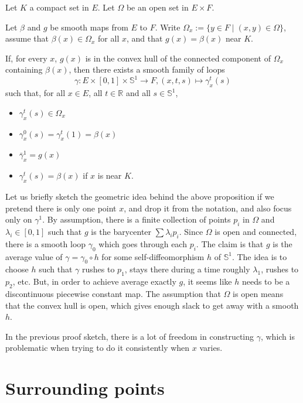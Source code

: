 \documentclass[10pt,a4paper]{article}
\newcommand{\co}{\!:}
\newcommand{\uses}[1]{}
\newcommand{\lean}[1]{}
\newcommand{\leanok}{}
\begin{document}
\begin{proposition}
  \label{prop:∃_loops}
  \lean{exist_loops}
  \uses{def:loop}
  \leanok
  Let $K$ a compact set in $E$. Let $Ω$ be an open set in $E × F$.

  Let $β$ and $g$ be smooth maps from $E$ to $F$.
  Write $Ω_x := \{ y ∈ F \mid (x, y) ∈ Ω\}$, assume that $β(x) ∈ Ω_x$ for all $x$,
  and that $g(x) = β(x)$ near $K$.

  If, for every $x$, $g(x)$ is in
  the convex hull of the connected component of $Ω_x$ containing $β(x)$,
  then there exists a smooth family of loops
  \[
    γ \co E × [0, 1] × 𝕊^1 → F, (x, t, s) ↦ γ^t_x(s)
  \]
  such that, for all $x ∈ E$, all $t ∈ ℝ$ and all  $s ∈ 𝕊^1$,
  \begin{itemize}
    \item
      $γ^t_x(s) ∈ Ω_x$
    \item
      $γ^0_x(s) = γ^t_x(1) = β(x)$
    \item
      $\bar γ^1_x = g(x)$
    \item
      $γ^t_x(s) = β(x)$ if $x$ is near $K$.
  \end{itemize}
\end{proposition}

Let us briefly sketch the geometric idea behind the above proposition
if we pretend there is only one point $x$, and drop it from the
notation, and also focus only on $γ^1$.
By assumption, there is a finite collection of points $p_i$ in $Ω$ and $λ_i ∈
[0, 1]$ such that $g$ is the barycenter $\sum λ_i p_i$. Since $Ω$ is open and
connected, there is a smooth loop $γ_0$ which goes through each $p_i$. The
claim is that $g$ is the average value of $γ = γ_0 ∘ h$ for some
self-diffeomorphism $h$ of $𝕊^1$. The idea is to choose $h$ such that
$γ$ rushes to $p_1$, stays there during a time roughly $λ_1$, rushes to
$p_2$, etc. But, in order to achieve average exactly $g$, it seems like $h$
needs to be a discontinuous piecewise constant map. The assumption that $Ω$ is
open means that the convex hull is open, which gives enough slack to get away with
a smooth $h$.

In the previous proof sketch, there is a lot of freedom in constructing $γ$,
which is problematic when trying to do it consistently when $x$ varies.

\section{Surrounding points}
\label{sec:preliminaries}
\end{document}

